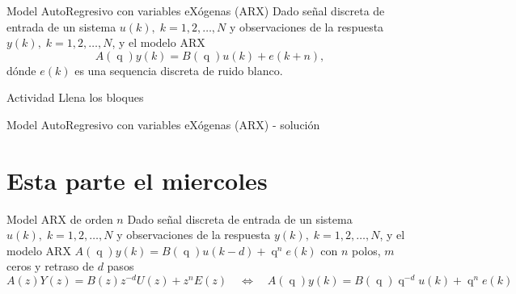 \documentclass[presentation,aspectratio=169]{beamer}
\DeclareMathOperator{\shift}{q}
\begin{document}
\begin{frame}[label={sec:orgb819ab1}]{Model AutoRegresivo con variables eXógenas (ARX)}
Dado señal discreta de entrada de un sistema \(u(k), \; k=1,2,\ldots, N\) y observaciones de la respuesta \(y(k), \; k=1,2,\ldots,N\), y el modelo ARX
\[ A(\shift) y(k) = B(\shift)u(k) + e(k+n),\]
dónde \(e(k)\) es una sequencia discreta de ruido blanco.

\alert{Actividad} Llena los bloques

\begin{center}
\end{center}
\end{frame}


\begin{frame}[label={sec:org33b1e1e}]{Model AutoRegresivo con variables eXógenas (ARX) - solución}
\end{frame}



\section{Esta parte el miercoles}
\label{sec:org3ea9ed7}
\begin{frame}[label={sec:org5163cba}]{Model ARX de orden \(n\)}
Dado señal discreta de entrada de un sistema \(u(k), \; k=1,2,\ldots, N\) y observaciones de la respuesta \(y(k), \; k=1,2,\ldots,N\), y el modelo ARX \(A(\shift)y(k) = B(\shift)u(k-d) + \shift^n e(k)\) con \(n\) polos, \(m\) ceros y retraso de \(d\) pasos
\[A(z)Y(z) = B(z)z^{-d}U(z) + z^nE(z) \quad \Leftrightarrow \quad A(\shift)y(k) = B(\shift)\shift^{-d}u(k) + \shift^{n} e(k)\]
\end{frame}
\end{document}
